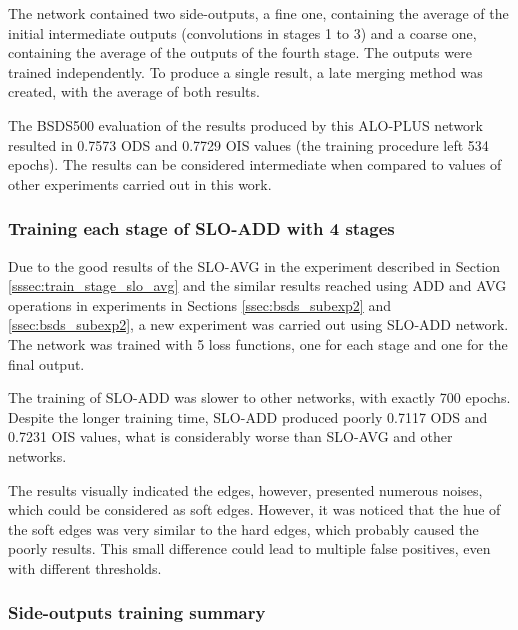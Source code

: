 The network contained two side-outputs, a fine one, containing the average of the initial intermediate outputs (convolutions in stages 1 to 3) and a coarse one, containing the average of the outputs of the fourth stage.
The outputs were trained independently.
To produce a single result, a late merging method was created, with the average of both results.

The BSDS500 evaluation of the results produced by this ALO-PLUS network resulted in 0.7573 ODS and 0.7729 OIS values (the training procedure left 534 epochs).
The results can be considered intermediate when compared to values of other experiments carried out in this work.


\subsubsection{Training each stage of SLO-ADD  with 4 stages}
\label{sssec:train_stage_slo_add}

Due to the good results of the SLO-AVG in the experiment described in Section \ref{sssec:train_stage_slo_avg} and the similar results reached using ADD and AVG operations in experiments in Sections \ref{ssec:bsds_subexp2} and \ref{ssec:bsds_subexp2}, a new experiment was carried out using SLO-ADD network.
The network was trained with 5 loss functions, one for each stage and one for the final output.

The training of SLO-ADD was slower to other networks, with exactly 700 epochs.
Despite the longer training time, SLO-ADD produced poorly 0.7117 ODS and 0.7231 OIS values, what is considerably worse than SLO-AVG and other networks.

The results visually indicated the edges, however, presented numerous noises, which could be considered as soft edges.
However, it was noticed that the hue of the soft edges was very similar to the hard edges, which probably caused the poorly results.
This small difference could lead to multiple false positives, even with different thresholds.

\subsubsection{Side-outputs training summary}
\label{sssec:sideout_train_summary}

